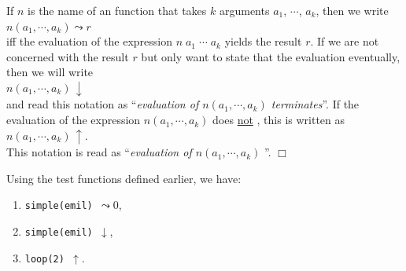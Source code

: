 \begin{Notation}[$\leadsto$, $\downarrow$, $\uparrow$]
If $n$ is the name of an \Fsharp{} function that takes $k$ arguments $a_1$, $\cdots$, $a_k$,
then we write 
\\[0.2cm]
\hspace*{1.3cm}
 $n(a_1, \cdots, a_k) \leadsto r$ 
\\[0.2cm]
iff the evaluation of the expression $n\;a_1\;\cdots\;a_k$ yields the result $r$.  If we are not
concerned with the result $r$ but only want to state that the evaluation  eventually,
then we will write
\\[0.2cm]
\hspace*{1.3cm} $n(a_1, \cdots, a_k) \,\downarrow$ \\[0.3cm]
and read this notation as ``\emph{evaluation of $n(a_1, \cdots, a_k)$ terminates}''.
If the evaluation of the expression $n(a_1, \cdots, a_k)$ does \underline{not} , this is
written as \\[0.2cm]
\hspace*{1.3cm}
 $n(a_1, \cdots, a_k) \,\uparrow$. 
\\[0.2cm]
This notation is read as ``\emph{evaluation of $n(a_1, \cdots, a_k)$ }''.
\hspace*{\fill} $\Box$
\end{Notation}

\examplesEng  Using the test functions defined earlier, we have:
\begin{enumerate}
\item {\tt simple(emil) $\leadsto 0$},
\item {\tt simple(emil) $\downarrow$},
\item {\tt loop(2) $\uparrow$}.
\end{enumerate}

